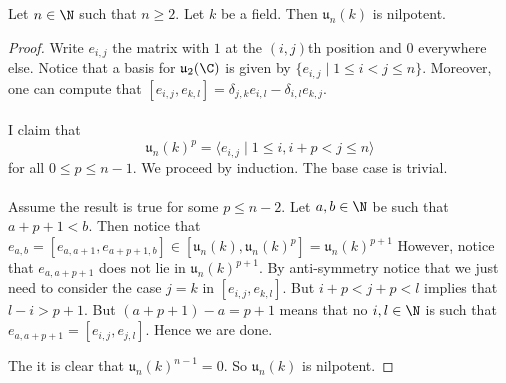 \documentclass[a4paper]{article}
\begin{document}
\begin{eg}{}{} Let $n\in\N$ such that $n\geq 2$. Let $k$ be a field. Then $\mathfrak{u}_n(k)$ is nilpotent. \tcbline
\begin{proof}
Write $e_{i,j}$ the matrix with $1$ at the $(i,j)$th position and $0$ everywhere else. Notice that a basis for $\mathfrak{u}_2(\C)$ is given by $\{e_{i,j}\;|\;1\leq i< j\leq n\}$. Moreover, one can compute that $[e_{i,j},e_{k,l}]=\delta_{j,k}e_{i,l}-\delta_{i,l}e_{k,j}$. \\~\\

I claim that $$\mathfrak{u}_n(k)^p=\langle e_{i,j}\;|\;1\leq i, i+p<j\leq n\rangle$$ for all $0\leq p\leq n-1$. We proceed by induction. The base case is trivial. \\~\\

Assume the result is true for some $p\leq n-2$. Let $a,b\in\N$ be such that $a+p+1<b$. Then notice that $e_{a,b}=[e_{a,a+1},e_{a+p+1,b}]\in[\mathfrak{u}_n(k),\mathfrak{u}_n(k)^p]=\mathfrak{u}_n(k)^{p+1}$ However, notice that $e_{a,a+p+1}$ does not lie in $\mathfrak{u}_n(k)^{p+1}$. By anti-symmetry notice that we just need to consider the case $j=k$ in $[e_{i,j},e_{k,l}]$. But $i+p<j+p<l$ implies that $l-i>p+1$. But $(a+p+1)-a=p+1$ means that no $i,l\in\N$ is such that $e_{a,a+p+1}=[e_{i,j},e_{j,l}]$. Hence we are done. 

The it is clear that $\mathfrak{u}_n(k)^{n-1}=0$. So $\mathfrak{u}_n(k)$ is nilpotent. 
\end{proof}
\end{eg}
\end{document}
